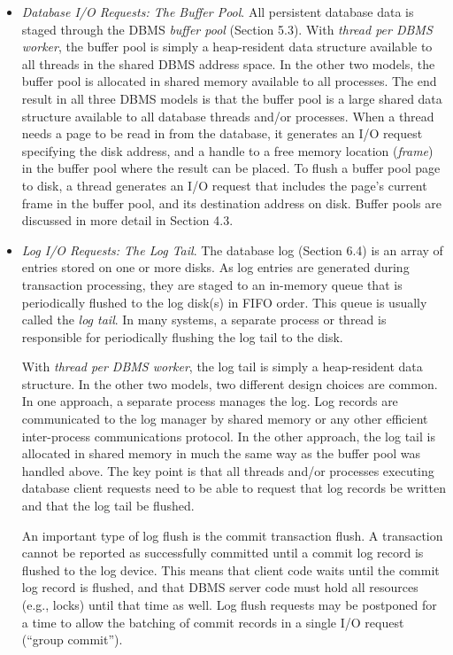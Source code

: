 \documentclass[b5paper,11pt,twoside,openright]{book}
\begin{document}
\begin{itemize}
\item
  \emph{Database I/O Requests: The Buffer Pool}. All persistent database
  data is staged through the DBMS \emph{buffer pool} (Section 5.3). With
  \emph{thread per DBMS worker}, the buffer pool is simply a
  heap-resident data structure available to all threads in the shared
  DBMS address space. In the other two models, the buffer pool is
  allocated in shared memory available to all processes. The end result
  in all three DBMS models is that the buffer pool is a large shared
  data structure available to all database threads and/or processes.
  When a thread needs a page to be read in from the database, it
  generates an I/O request specifying the disk address, and a handle to
  a free memory location (\emph{frame}) in the buffer pool where the
  result can be placed. To flush a buffer pool page to disk, a thread
  generates an I/O request that includes the page's current frame in the
  buffer pool, and its destination address on disk. Buffer pools are
  discussed in more detail in Section 4.3.
\item
  \emph{Log I/O Requests: The Log Tail}. The database log (Section 6.4)
  is an array of entries stored on one or more disks. As log entries are
  generated during transaction processing, they are staged to an
  in-memory queue that is periodically flushed to the log disk(s) in
  FIFO order. This queue is usually called the \emph{log tail}. In many
  systems, a separate process or thread is responsible for periodically
  flushing the log tail to the disk.

With \emph{thread per DBMS worker}, the log tail is simply a
heap-resident data structure. In the other two models, two different
design choices are common. In one approach, a separate process manages
the log. Log records are communicated to the log manager by shared
memory or any other efficient inter-process communications protocol. In
the other approach, the log tail is allocated in shared memory in much
the same way as the buffer pool was handled above. The key point is that
all threads and/or processes executing database client requests need to
be able to request that log records be written and that the log tail be
flushed.

An important type of log flush is the commit transaction flush. A
transaction cannot be reported as successfully committed until a commit
log record is flushed to the log device. This means that client code
waits until the commit log record is flushed, and that DBMS server code
must hold all resources (e.g., locks) until that time as well. Log flush
requests may be postponed for a time to allow the batching of commit
records in a single I/O request (``group commit'').
\end{itemize}
\end{document}
